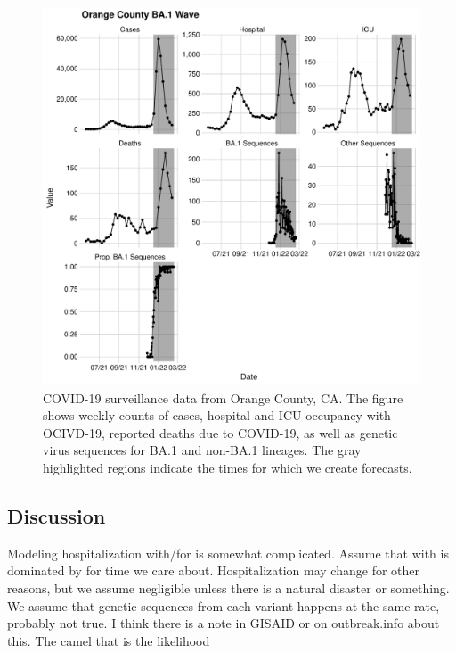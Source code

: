 \begin{figure}
    \centering
    \includegraphics[width=1.0\columnwidth]{orange_county_binned_data_plot.pdf}
    \caption[COVID-19 surveillance data from Orange County, California.]{
COVID-19 surveillance data from Orange County, CA.
The figure shows weekly counts of cases, hospital and ICU occupancy with OCIVD-19, reported deaths due to COVID-19, as well as genetic virus sequences for BA.1 and non-BA.1 lineages.
The gray highlighted regions indicate the times for which we create forecasts.}
    \label{ch_5:fig:orange_county_binned_data_plot}
\end{figure}

\subsection{Discussion}
\label{ch_5:subsec:discussion}
Modeling hospitalization with/for is somewhat complicated.
Assume that with is dominated by for time we care about.
Hospitalization may change for other reasons, but we assume negligible unless there is a natural disaster or something.
We assume that genetic sequences from each variant happens at the same rate, probably not true.
I think there is a note in GISAID or on outbreak.info about this.
The camel that is the likelihood